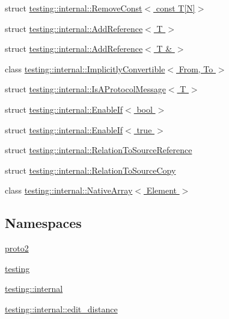\begin{DoxyCompactItemize}
struct \hyperlink{structtesting_1_1internal_1_1RemoveConst_3_01const_01T[N]_4}{testing\+::internal\+::\+Remove\+Const$<$ const T\mbox{[}\+N\mbox{]}$>$}
\item 
struct \hyperlink{structtesting_1_1internal_1_1AddReference}{testing\+::internal\+::\+Add\+Reference$<$ T $>$}
\item 
struct \hyperlink{structtesting_1_1internal_1_1AddReference_3_01T_01_6_01_4}{testing\+::internal\+::\+Add\+Reference$<$ T \& $>$}
\item 
class \hyperlink{classtesting_1_1internal_1_1ImplicitlyConvertible}{testing\+::internal\+::\+Implicitly\+Convertible$<$ From, To $>$}
\item 
struct \hyperlink{structtesting_1_1internal_1_1IsAProtocolMessage}{testing\+::internal\+::\+Is\+A\+Protocol\+Message$<$ T $>$}
\item 
struct \hyperlink{structtesting_1_1internal_1_1EnableIf}{testing\+::internal\+::\+Enable\+If$<$ bool $>$}
\item 
struct \hyperlink{structtesting_1_1internal_1_1EnableIf_3_01true_01_4}{testing\+::internal\+::\+Enable\+If$<$ true $>$}
\item 
struct \hyperlink{structtesting_1_1internal_1_1RelationToSourceReference}{testing\+::internal\+::\+Relation\+To\+Source\+Reference}
\item 
struct \hyperlink{structtesting_1_1internal_1_1RelationToSourceCopy}{testing\+::internal\+::\+Relation\+To\+Source\+Copy}
\item 
class \hyperlink{classtesting_1_1internal_1_1NativeArray}{testing\+::internal\+::\+Native\+Array$<$ Element $>$}
\end{DoxyCompactItemize}
\subsection*{Namespaces}
\begin{DoxyCompactItemize}
\item 
 \hyperlink{namespaceproto2}{proto2}
\item 
 \hyperlink{namespacetesting}{testing}
\item 
 \hyperlink{namespacetesting_1_1internal}{testing\+::internal}
\item 
 \hyperlink{namespacetesting_1_1internal_1_1edit__distance}{testing\+::internal\+::edit\+\_\+distance}
\end{DoxyCompactItemize}
